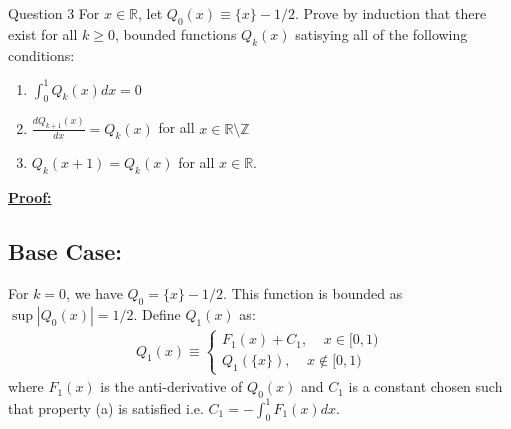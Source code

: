 \documentclass{article}
\newcommand{\R}{\mathbb{R}}
\begin{document}
\begin{mathdefinitionbox}{Question 3}
\vskip 0.5cm
For $x \in \R$, let $Q_0(x) \equiv \{x\} - 1/2$. Prove by induction that there exist for all $k \geq 0$, bounded functions $Q_k(x)$ satisying all of the following conditions:
\begin{enumerate}[label=(\alph*)]
  \item $\int_{0}^{1} Q_k(x) dx = 0$
  \item $\frac{dQ_{k+1}(x)}{dx} = Q_k(x)$ for all $x \in \R \setminus \mathbb{Z}$
  \item $Q_{k}(x+1) = Q_k(x)$ for all $x \in \R$. 
\end{enumerate}
\end{mathdefinitionbox}

\vskip 0.5cm
\underline{\textbf{Proof:}}

\subsection*{Base Case:}

For $k = 0$, we have $Q_0 = \{x\} - 1/2$. This function is bounded as $\sup |Q_0(x)| = 1/2$. Define $Q_1(x)$ as: 
\begin{align*}
  Q_1(x) \equiv \begin{cases}
    F_1(x) + C_1, \;\;\;\; x\in [0, 1)\\
    Q_1(\{x\}), \;\;\;\; x \not\in [0, 1)
  \end{cases}
\end{align*}
where $F_1(x)$ is the anti-derivative of $Q_0(x)$ and $C_1$ is a constant chosen such that property (a) is satisfied i.e. $C_1 = - \int_{0}^{1} F_1(x) dx$.
\end{document}
